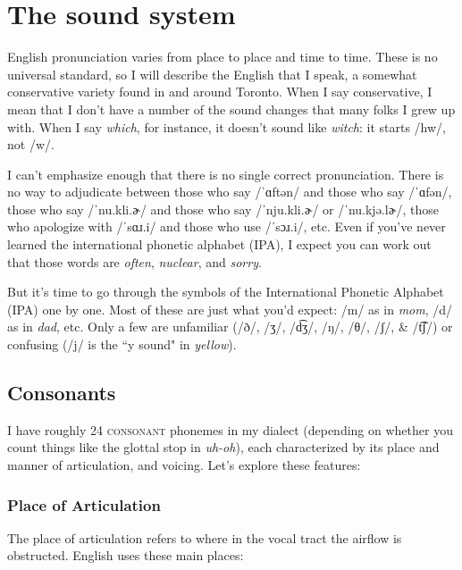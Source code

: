 \section{The sound system}
English pronunciation varies from place to place and time to time. These is no universal standard, so I will describe the English that I speak, a somewhat conservative variety found in and around Toronto. When I say conservative, I mean that I don't have a number of the sound changes that many folks I grew up with. When I say \textit{which}, for instance, it doesn't sound like \textit{witch}: it starts /hw/, not /w/. 

I can't emphasize enough that there is no single correct pronunciation. There is no way to adjudicate between those who say /ˈɑftən/ and those who say /ˈɑfən/, those who say /ˈnu.kli.ɚ/ and those who say /ˈnju.kli.ɚ/ or /ˈnu.kjə.lɚ/, those who apologize with /ˈsɑɹ.i/ and those who use /ˈsɔɹ.i/, etc. Even if you've never learned the international phonetic alphabet (IPA), I expect you can work out that those words are \textit{often}, \textit{nuclear}, and \textit{sorry}. 

But it's time to go through the symbols of the International Phonetic Alphabet (IPA) one by one. Most of these are just what you'd expect: /m/ as in \textit{mom}, /d/ as in \textit{dad}, etc. Only a few are unfamiliar (/ð/, /ʒ/, /d͡ʒ/, /ŋ/, /θ/, /ʃ/, \& /t͡ʃ/) or confusing (/j/ is the ``y sound" in \textit{yellow}).

\subsection{Consonants}

I have roughly 24 \textsc{consonant} phonemes in my dialect (depending on whether you count things like the glottal stop in \textit{uh-oh}), each characterized by its place and manner of articulation, and voicing. Let's explore these features:

\subsubsection{Place of Articulation}

The place of articulation refers to where in the vocal tract the airflow is obstructed. English uses these main places:

